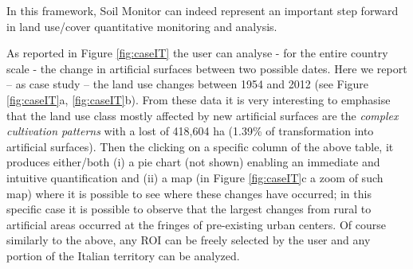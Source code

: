 \documentclass[APA,LATO1COL,doublespace]{WileyNJD-v2}
\begin{document}
In this framework, Soil Monitor can indeed represent an important step forward in land use/cover quantitative monitoring and analysis.


As reported in Figure \ref{fig:caseIT} the user can analyse - for the entire country scale - the change in artificial surfaces between two possible dates. Here we report – as case study – the land use changes between 1954 and 2012 (see Figure \ref{fig:caseIT}a, \ref{fig:caseIT}b). From these data it is very interesting to emphasise that the land use class mostly affected by new artificial surfaces are the \textit{complex cultivation patterns} with a lost of 418,604 ha (1.39\% of transformation into artificial surfaces). Then the  clicking on a specific column of the above table, it produces either/both (i) a pie chart (not shown) enabling an immediate and intuitive quantification and (ii) a map (in Figure \ref{fig:caseIT}c a zoom of such map) where it is possible to see where these changes have occurred; in this specific case it is possible to observe that the largest changes from rural to artificial areas occurred at the fringes of pre-existing urban centers.
Of course similarly to the above, any ROI can be freely selected by the user and any portion of the Italian territory can be analyzed. 
\end{document}
